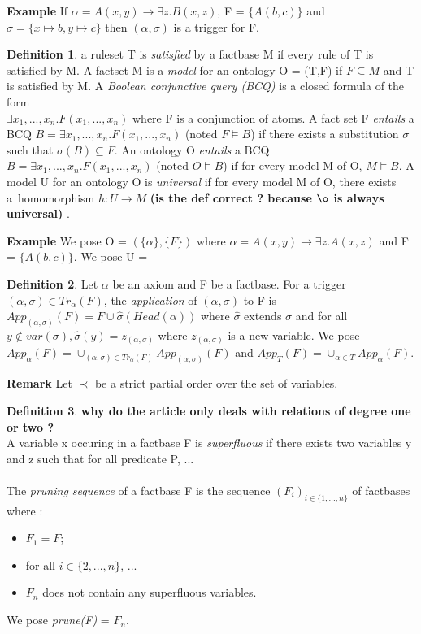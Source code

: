 \documentclass{article}
\theoremstyle{proposal}
\theoremstyle{definition}
\newtheorem{definition}{Definition}[section]
\theoremstyle{theorem}
\begin{document}
\noindent \textbf{Example} If $\alpha = A(x,y) \rightarrow \exists z.B(x,z)$, F = $\{A(b,c)\}$ and $\sigma = \{x \mapsto b, y \mapsto c \}$ then $(\alpha,\sigma)$ is a trigger for F.

\begin{definition}
a ruleset T is \emph{satisfied} by a factbase M if every rule of T is satisfied by M. A factset M is a \emph{model} for an ontology O = (T,F) if $F \subseteq M$ and T is satisfied by M. A \emph{Boolean conjunctive query (BCQ)} is a closed formula of the form \\ $\exists x_1,...,x_n. F(x_1,...,x_n)$ where F is a conjunction of atoms. A fact set F \emph{entails} a BCQ $B = \exists x_1,...,x_n.F(x_1,...,x_n)$ (noted $F \vDash B$) if there exists a substitution $\sigma$ such that $\sigma(B) \subseteq F$. An ontology O \emph{entails} a BCQ $B = \exists x_1,...,x_n.F(x_1,...,x_n)$ (noted $O \vDash B$) if for every model M of O, $M \vDash B$. A model U for an ontology O is \emph{universal} if for
every model M of O, there exists a\ homomorphism $h : U \to M$ \textbf{(is the def correct ? because $\o$ is always universal)} .
\end{definition}

\noindent \textbf{Example} We pose O = $(\{\alpha\},\{F\})$ where $\alpha = A(x,y) \rightarrow \exists z.A(x,z)$ and F = $\{A(b,c)\}$. We pose U =

\begin{definition}
Let $\alpha$ be an axiom and F be a factbase. For a trigger $(\alpha,\sigma) \in Tr_\alpha(F)$, the \emph{application} of $(\alpha,\sigma)$ to F is $App_{(\alpha,\sigma)}(F) = F\cup \hat \sigma(Head(\alpha))$ where $\hat \sigma$ extends $\sigma$ and for all $y \notin var(\sigma), \hat \sigma(y) = z_{(\alpha,\sigma)}$ where $z_{(\alpha,\sigma)}$ is a new variable. We pose $App_{\alpha}(F) = \cup_{(\alpha,\sigma) \in Tr_\alpha(F)}App_{(\alpha,\sigma)}(F)$ and $App_{T}(F) = \cup_{\alpha \in T}App_{\alpha}(F)$.

\end{definition} 

\noindent \textbf{Remark} Let $\prec$ be a strict partial order over the set of variables.

\begin{definition} \textbf{why do the article only deals with relations of degree one or two ?} \\
A variable x occuring in a factbase F is \emph{superfluous} if there exists two variables y and z such that for all predicate P, ... \\ \\
The \emph{pruning sequence} of a factbase F is the sequence $(F_i)_{i \in \{1,...,n\}}$ of factbases where :
\begin{itemize}
\item $F_1 = F$;
\item for all $i \in \{2,...,n\}$, ...
\item $F_n$ does not contain any superfluous variables.
\end{itemize}
We pose \emph{prune(F)} = $F_n$.

\end{definition} 
\end{document}

